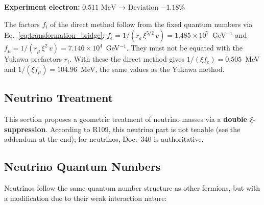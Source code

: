 	\textbf{Experiment electron:} $0.511 \text{ MeV}$ → Deviation $-1.18\%$

	The factors $f_i$ of the direct method follow from the fixed quantum numbers via Eq.~\ref{eq:transformation_bridge}: $f_e = 1/(r_e\,\xi^{5/2}\,v) = 1.485 \times 10^7$~GeV$^{-1}$ and $f_\mu = 1/(r_\mu\,\xi^{2}\,v) = 7.146 \times 10^4$~GeV$^{-1}$. They must not be equated with the Yukawa prefactors $r_i$. With these the direct method gives $1/(\xi f_e) = 0.505$~MeV and $1/(\xi f_\mu) = 104.96$~MeV, the same values as the Yukawa method.
	
	\subsection{Neutrino Treatment}
	\label{sec:complete_neutrino_treatment}
	
	\begin{neutrino}
		This section proposes a geometric treatment of neutrino masses via a \textbf{double $\xi$-suppression}. According to R109, this neutrino part is not tenable (see the addendum at the end); for neutrinos, Doc.~340 is authoritative.
	\end{neutrino}
	
	\subsection{Neutrino Quantum Numbers}
	\label{subsec:neutrino_quantum_numbers}
	
	Neutrinos follow the same quantum number structure as other fermions, but with a modification due to their weak interaction nature:
	
	\begin{table}[H]
		\centering
		\caption{Neutrino quantum numbers with characteristic double $\xi$-suppression}
		\label{tab:neutrino_quantum_numbers}
	\end{table}
	
